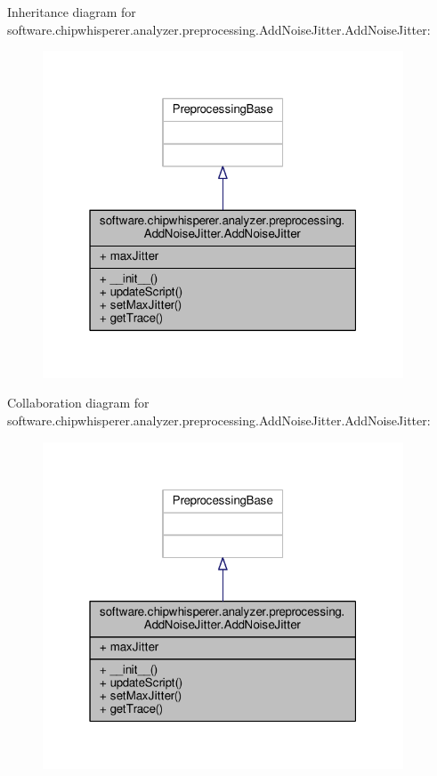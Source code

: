 Inheritance diagram for software.\+chipwhisperer.\+analyzer.\+preprocessing.\+Add\+Noise\+Jitter.\+Add\+Noise\+Jitter\+:\nopagebreak
\begin{figure}[H]
\begin{center}
\leavevmode
\includegraphics[width=304pt]{d3/d0a/classsoftware_1_1chipwhisperer_1_1analyzer_1_1preprocessing_1_1AddNoiseJitter_1_1AddNoiseJitter__inherit__graph}
\end{center}
\end{figure}


Collaboration diagram for software.\+chipwhisperer.\+analyzer.\+preprocessing.\+Add\+Noise\+Jitter.\+Add\+Noise\+Jitter\+:\nopagebreak
\begin{figure}[H]
\begin{center}
\leavevmode
\includegraphics[width=304pt]{d5/d52/classsoftware_1_1chipwhisperer_1_1analyzer_1_1preprocessing_1_1AddNoiseJitter_1_1AddNoiseJitter__coll__graph}
\end{center}
\end{figure}


